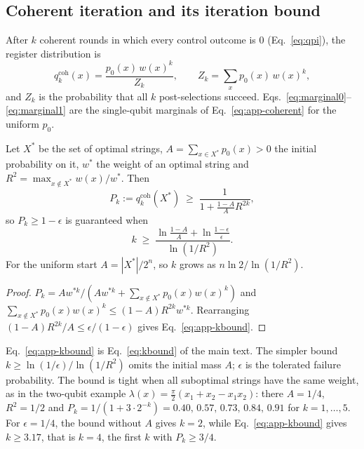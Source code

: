 \subsection{Coherent iteration and its iteration bound}
\label{app:coherent}
After $k$ coherent rounds in which every control outcome is $0$ (Eq.~\ref{eq:qpi}), the register distribution is
\begin{equation}
q^{\mathrm{coh}}_k(x)=\frac{p_0(x)\,w(x)^k}{Z_k},\qquad Z_k=\sum_x p_0(x)\,w(x)^k ,
\label{eq:app-coherent}
\end{equation}
and $Z_k$ is the probability that all $k$ post-selections succeed. Eqs.~\eqref{eq:marginal0}--\eqref{eq:marginal1} are the single-qubit marginals of Eq.~\eqref{eq:app-coherent} for the uniform $p_0$.

\begin{proposition}
\label{prop:kbound}
Let $X^*$ be the set of optimal strings, $A=\sum_{x\in X^*}p_0(x)>0$ the initial probability on it, $w^*$ the weight of an optimal string and $R^2=\max_{x\notin X^*}w(x)/w^*$. Then
\begin{equation}
P_k:=q^{\mathrm{coh}}_k(X^*)\;\ge\;\frac{1}{1+\frac{1-A}{A}R^{2k}},
\end{equation}
so $P_k\ge1-\epsilon$ is guaranteed when
\begin{equation}
k\;\ge\;\frac{\ln\frac{1-A}{A}+\ln\frac{1-\epsilon}{\epsilon}}{\ln(1/R^2)} .
\label{eq:app-kbound}
\end{equation}
For the uniform start $A=|X^*|/2^n$, so $k$ grows as $n\ln2/\ln(1/R^2)$.
\end{proposition}
\begin{proof}
$P_k=Aw^{*k}/(Aw^{*k}+\sum_{x\notin X^*}p_0(x)w(x)^k)$ and $\sum_{x\notin X^*}p_0(x)w(x)^k\le(1-A)R^{2k}w^{*k}$. Rearranging $(1-A)R^{2k}/A\le\epsilon/(1-\epsilon)$ gives Eq.~\eqref{eq:app-kbound}.
\end{proof}

Eq.~\eqref{eq:app-kbound} is Eq.~\eqref{eq:kbound} of the main text. The simpler bound $k\ge\ln(1/\epsilon)/\ln(1/R^2)$ omits the initial mass $A$; $\epsilon$ is the tolerated failure probability. The bound is tight when all suboptimal strings have the same weight, as in the two-qubit example $\lambda(x)=\frac{\pi}{2}(x_1+x_2-x_1x_2)$: there $A=1/4$, $R^2=1/2$ and $P_k=1/(1+3\cdot2^{-k})=0.40,\,0.57,\,0.73,\,0.84,\,0.91$ for $k=1,\dots,5$. For $\epsilon=1/4$, the bound without $A$ gives $k=2$, while Eq.~\eqref{eq:app-kbound} gives $k\ge3.17$, that is $k=4$, the first $k$ with $P_k\ge3/4$.

